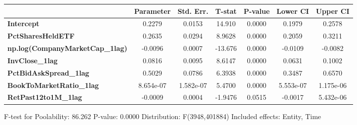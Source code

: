 \begin{center}
\begin{tabular}{lclc}
\bottomrule
\end{tabular}
\begin{tabular}{lcccccc}
                                        & \textbf{Parameter} & \textbf{Std. Err.} & \textbf{T-stat} & \textbf{P-value} & \textbf{Lower CI} & \textbf{Upper CI}  \\
\midrule
\textbf{Intercept}                      &       0.2279       &       0.0153       &      14.910     &      0.0000      &       0.1979      &       0.2578       \\
\textbf{PctSharesHeldETF}               &       0.2635       &       0.0294       &      8.9628     &      0.0000      &       0.2059      &       0.3211       \\
\textbf{np.log(CompanyMarketCap\_1lag)} &      -0.0096       &       0.0007       &     -13.676     &      0.0000      &      -0.0109      &      -0.0082       \\
\textbf{InvClose\_1lag}                 &       0.0816       &       0.0095       &      8.6147     &      0.0000      &       0.0631      &       0.1002       \\
\textbf{PctBidAskSpread\_1lag}          &       0.5029       &       0.0786       &      6.3938     &      0.0000      &       0.3487      &       0.6570       \\
\textbf{BookToMarketRatio\_1lag}        &     8.654e-07      &     1.582e-07      &      5.4700     &      0.0000      &     5.553e-07     &     1.175e-06      \\
\textbf{RetPast12to1M\_1lag}            &      -0.0009       &       0.0004       &     -1.9476     &      0.0515      &      -0.0017      &     5.432e-06      \\
\bottomrule
\end{tabular}
\end{center}

F-test for Poolability: 86.262 \newline
 P-value: 0.0000 \newline
 Distribution: F(3948,401884) \newline
  \newline
 Included effects: Entity, Time